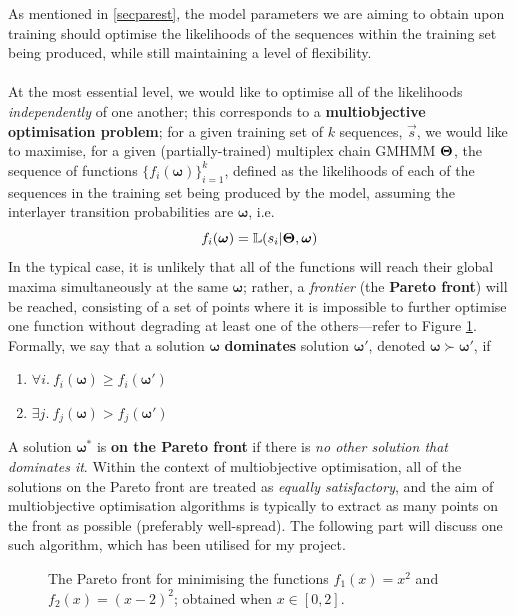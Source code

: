\documentclass[12pt,a4paper,twoside,openright]{report}
\newcommand\bomega{\boldsymbol\omega}
\begin{document}
As mentioned in \cref{secparest}, the model parameters we are aiming to obtain upon training should optimise the likelihoods of the sequences within the training set being produced, while still maintaining a level of flexibility.\\ \\
At the most essential level, we would like to optimise all of the likelihoods \emph{independently} of one another; this corresponds to a {\bf multiobjective optimisation problem}; for a given training set of $k$ sequences, $\vec{s}$, we would like to maximise, for a given (partially-trained) multiplex chain GMHMM $\bf \Theta$, the sequence of functions $\{f_i(\boldsymbol\omega)\}_{i=1}^{k}$, defined as the likelihoods of each of the sequences in the training set being produced by the model, assuming the interlayer transition probabilities are $\boldsymbol \omega$, i.e.
\[f_i(\boldsymbol \omega) = \mathbb{L}(s_i | \bf \Theta, \boldsymbol\omega)\]
In the typical case, it is unlikely that all of the functions will reach their global maxima simultaneously at the same $\boldsymbol\omega$; rather, a \emph{frontier} (the {\bf Pareto front}) will be reached, consisting of a set of points where it is impossible to further optimise one function without degrading at least one of the others---refer to Figure \ref{figparetoplot}. Formally, we say that a solution $\boldsymbol \omega$ {\bf dominates} solution $\boldsymbol \omega'$, denoted $\bomega \succ \bomega'$, if
\begin{enumerate}
	\item $\forall i.\ f_i(\bomega) \geq f_i(\bomega')$
	\item $\exists j.\ f_j(\bomega) > f_j(\bomega')$
\end{enumerate}
A solution $\bomega^*$ is \textbf{on the Pareto front} if there is \emph{no other solution that dominates it}. Within the context of multiobjective optimisation, all of the solutions on the Pareto front are treated as \emph{equally satisfactory}, and the aim of multiobjective optimisation algorithms is typically to extract as many points on the front as possible (preferably well-spread). The following part will discuss one such algorithm, which has been utilised for my project.
\begin{figure}[H]
\centering
{}
	\caption[Example of a Pareto front]{\centering The Pareto front for minimising the functions $f_1(x) = x^2$ and $f_2(x)=(x-2)^2$; obtained when $x\in [0, 2]$.}\label{figparetoplot}
\end{figure}
\end{document}
